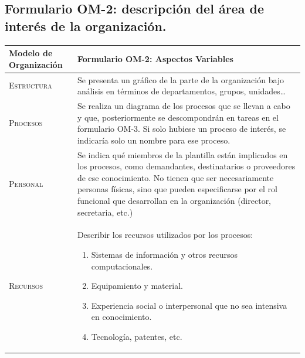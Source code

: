 \documentclass[12pt,a4paper,twoside,spanish]{article}      %
\begin{document}
            
            \pagebreak
            
        \subsection{Formulario OM-2: descripción del área de interés de la organización.}

                
            \begin{table}[H]
                \scriptsize
                \begin{tabularx}{\textwidth}{|l|X|} \hline
                    \textbf{Modelo de Organización} & \textbf{Formulario OM-2: Aspectos Variables} \\ \hline\hline
                    
                    \textsc{Estructura} & Se presenta un gráfico de la parte de la organización bajo análisis en términos de
                    departamentos, grupos, unidades\ldots\\ \hline
                    
                    \textsc{Procesos} & Se realiza un diagrama de los procesos que se llevan a cabo y que, posteriormente se descompondrán en tareas en el formulario OM-3. Si solo hubiese un proceso de interés, se indicaría solo un nombre para ese proceso.\\ \hline
                    
                    \textsc{Personal} &  Se indica qué miembros de la plantilla están implicados en los procesos, como demandantes, destinatarios o proveedores de ese conocimiento. No tienen que ser necesariamente personas físicas, sino que pueden especificarse por el rol
                    funcional que desarrollan en la organización (director, secretaria, etc.)\\ \hline
                    
                    \textsc{Recursos} &  Describir los recursos utilizados por los procesos:
                    
                    \begin{enumerate}
                        \item Sistemas de información y otros recursos computacionales.
                        \item Equipamiento y material.
                        \item Experiencia social o interpersonal que no sea intensiva en conocimiento.
                        \item Tecnología, patentes, etc.
                    \end{enumerate} \\ \hline
                    

\end{tabularx}
\end{table}
\end{document}
